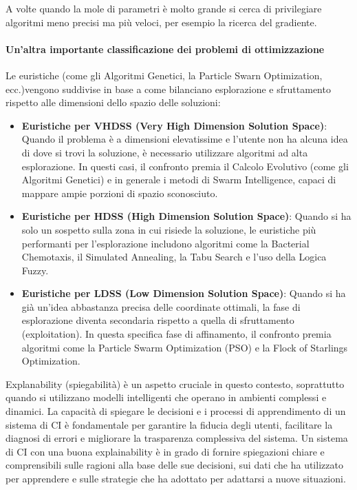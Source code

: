 A volte quando la mole di parametri è molto grande si cerca di privilegiare 
algoritmi meno precisi ma più veloci, per esempio la ricerca del gradiente.

\paragraph{Un'altra importante classificazione dei problemi di ottimizzazione}
Le euristiche (come gli Algoritmi Genetici, la Particle Swarn Optimization, ecc.)vengono 
suddivise in base a come bilanciano esplorazione e sfruttamento rispetto alle dimensioni
dello spazio delle soluzioni:

\begin{itemize}
    \item \textbf{Euristiche per VHDSS (Very High Dimension Solution Space)}: Quando 
    il problema è a dimensioni elevatissime e l'utente non ha alcuna idea di dove
    si trovi la soluzione, è necessario utilizzare algoritmi ad alta esplorazione. 
    In questi casi, il confronto premia il Calcolo Evolutivo (come gli Algoritmi
    Genetici) e in generale i metodi di Swarm Intelligence, capaci di mappare ampie
    porzioni di spazio sconosciuto.
    \item \textbf{Euristiche per HDSS (High Dimension Solution Space)}: Quando si ha
    solo un sospetto sulla zona in cui risiede la soluzione, le euristiche più
    performanti per l'esplorazione includono algoritmi come la Bacterial Chemotaxis, 
    il Simulated Annealing, la Tabu Search e l'uso della Logica Fuzzy.
    \item \textbf{Euristiche per LDSS (Low Dimension Solution Space)}: Quando si ha 
    già un'idea abbastanza precisa delle coordinate ottimali, la fase di esplorazione
    diventa secondaria rispetto a quella di sfruttamento (exploitation). In questa
    specifica fase di affinamento, il confronto premia algoritmi come la Particle
    Swarm Optimization (PSO) e la Flock of Starlings Optimization.
\end{itemize}

Explanability (spiegabilità) è un aspetto cruciale in questo contesto, soprattutto
quando si utilizzano modelli intelligenti che operano in ambienti complessi e dinamici.
La capacità di spiegare le decisioni e i processi di apprendimento di un sistema di
CI è fondamentale per garantire la fiducia degli utenti, facilitare la diagnosi di errori 
e migliorare la trasparenza complessiva del sistema.
Un sistema di CI con una buona explainability è in grado di fornire spiegazioni chiare
e comprensibili sulle ragioni alla base delle sue decisioni, sui dati che ha 
utilizzato per apprendere e sulle strategie che ha adottato per adattarsi a nuove 
situazioni.

